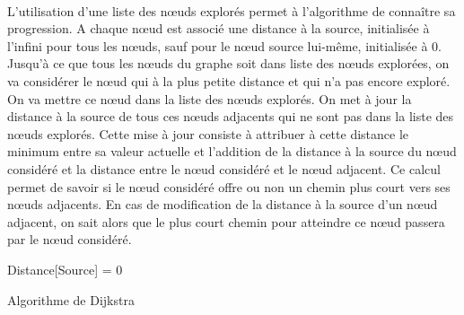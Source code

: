 \documentclass[pidr]{tnreport}
\begin{document}
\paragraph{}
L'utilisation d'une liste des nœuds explorés permet à l'algorithme de connaître sa progression. A chaque nœud est associé une distance à la source, initialisée à l'infini pour tous les nœuds, sauf pour le nœud source lui-même, initialisée à 0. Jusqu'à ce que tous les nœuds du graphe soit dans liste des nœuds explorées, on va considérer le nœud qui à la plus petite distance et qui n'a pas encore exploré. On va mettre ce nœud dans la liste des nœuds explorés. On met à jour la distance à la source de tous ces nœuds adjacents qui ne sont pas dans la liste des nœuds explorés. Cette mise à jour consiste à attribuer à cette distance le minimum entre sa valeur actuelle et l'addition de la distance à la source du nœud considéré et la distance entre le nœud considéré et le nœud adjacent. Ce calcul permet de savoir si le nœud considéré offre ou non un chemin plus court vers ses nœuds adjacents. En cas de modification de la distance à la source d'un nœud adjacent, on sait alors que le plus court chemin pour atteindre ce nœud passera par le nœud considéré.   

\begin{algorithm}[H]


 Distance[Source] = 0\linebreak
  
 \caption{Algorithme de Dijkstra}
\end{algorithm}
\end{document}
